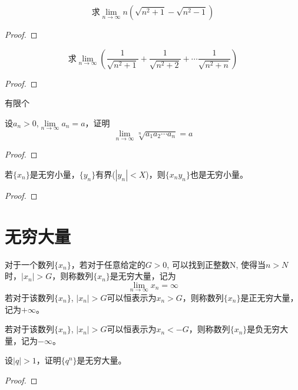 \begin{proposition}
    \[\text{求}\lim\limits_{n \to \infty} n\left( \sqrt{n^2+1} - \sqrt{n^2 - 1}\right) \]
\end{proposition}
\begin{proof}
    
\end{proof}

\begin{proposition}
    \[\text{求}\lim\limits_{n \to \infty} \left( \frac{1}{\sqrt{n^2+1}} + \frac{1}{\sqrt{n^2 + 2}} + \cdots \frac{1}{\sqrt{n^2+n}} \right) \]
\end{proposition}
\begin{proof}
    
\end{proof}
有限个

\begin{proposition}
    设$a_n > 0$,$\lim\limits_{n \to \infty} a_n = a$，证明
    \[ \lim_{n \to \infty}\sqrt[n]{a_1a_2\cdots a_n} = a \]
\end{proposition}
\begin{proof}
    
\end{proof}

\begin{proposition}
    若$\{ x_n \}$是无穷小量，$\{ y_n \}$有界($| y_n | < X$)，则$\{ x_n y_n \}$也是无穷小量。
\end{proposition}
\begin{proof}

\end{proof}

\section{无穷大量}
\begin{definition}[无穷大量]
对于一个数列$\{ x_n \}$，若对于任意给定的$G > 0$, 可以找到正整数N, 使得当$n > N$时，$| x_n |> G$，则称数列$\{ x_n \}$是无穷大量，记为
\[ \lim_{n \to \infty } x_n = \infty \]
若对于该数列$\{ x_n \}$, $| x_n |> G$可以恒表示为$x_n > G$，则称数列$\{ x_n \}$是正无穷大量，记为$+\infty$。

若对于该数列$\{ x_n \}$, $| x_n |> G$可以恒表示为$x_n < -G$，则称数列$\{ x_n \}$是负无穷大量，记为$-\infty$。
\end{definition}

\begin{proposition}
    设$| q | > 1$，证明$\{ q^n \}$是无穷大量。 
\end{proposition}
\begin{proof}
    
\end{proof}

